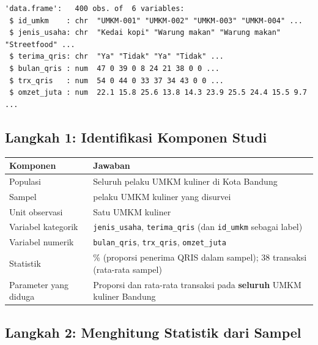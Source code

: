 \documentclass[
  indonesian,
  letterpaper,
]{book}
\newcounter{none} %
\begin{document}
\begin{verbatim}
'data.frame':   400 obs. of  6 variables:
 $ id_umkm    : chr  "UMKM-001" "UMKM-002" "UMKM-003" "UMKM-004" ...
 $ jenis_usaha: chr  "Kedai kopi" "Warung makan" "Warung makan" "Streetfood" ...
 $ terima_qris: chr  "Ya" "Tidak" "Ya" "Tidak" ...
 $ bulan_qris : num  47 0 39 0 8 24 21 38 0 0 ...
 $ trx_qris   : num  54 0 44 0 33 37 34 43 0 0 ...
 $ omzet_juta : num  22.1 15.8 25.6 13.8 14.3 23.9 25.5 24.4 15.5 9.7 ...
\end{verbatim}

\subsection{Langkah 1: Identifikasi Komponen
Studi}\label{langkah-1-identifikasi-komponen-studi}

{\def\LTcaptype{none} %
\begin{longtable}[]{@{}
  >{\raggedright\arraybackslash}p{}
  >{\raggedright\arraybackslash}p{}@{}}
\toprule\noalign{}
\begin{minipage}[b]{\linewidth}\raggedright
Komponen
\end{minipage} & \begin{minipage}[b]{\linewidth}\raggedright
Jawaban
\end{minipage} \\
\midrule\noalign{}
\endhead
\bottomrule\noalign{}
\endlastfoot
Populasi & Seluruh pelaku UMKM kuliner di Kota Bandung \\
Sampel & 400 pelaku UMKM kuliner yang disurvei \\
Unit observasi & Satu UMKM kuliner \\
Variabel kategorik & \texttt{jenis\_usaha}, \texttt{terima\_qris} (dan
\texttt{id\_umkm} sebagai label) \\
Variabel numerik & \texttt{bulan\_qris}, \texttt{trx\_qris},
\texttt{omzet\_juta} \\
Statistik & 72\% (proporsi penerima QRIS dalam sampel); 38 transaksi
(rata-rata sampel) \\
Parameter yang diduga & Proporsi dan rata-rata transaksi pada
\textbf{seluruh} UMKM kuliner Bandung \\
\end{longtable}
}

\subsection{Langkah 2: Menghitung Statistik dari
Sampel}\label{langkah-2-menghitung-statistik-dari-sampel}
\end{document}
